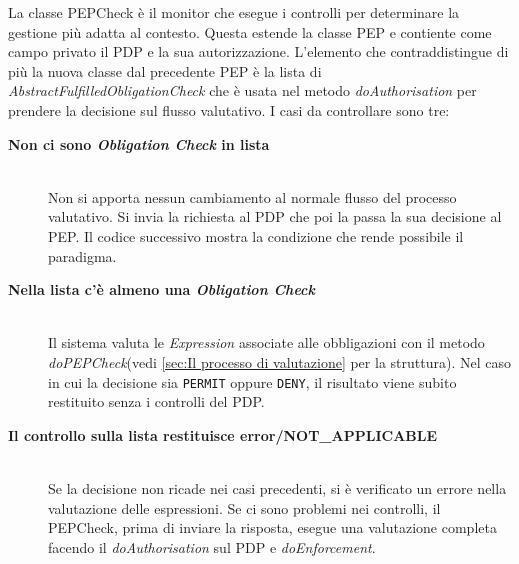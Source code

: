 La classe PEPCheck è il monitor che esegue i controlli per determinare la gestione più adatta al contesto.
Questa estende la classe \ac{PEP} e contiente come campo privato il \ac{PDP} e la sua autorizzazione.
L'elemento che contraddistingue di più la nuova classe dal precedente \ac{PEP} è la lista di
\emph{AbstractFulfilledObligationCheck} che è usata nel metodo \emph{doAuthorisation}
per prendere la decisione sul flusso valutativo. I casi da controllare sono tre:
\begin{description}

  \item[\normalfont\bfseries{\MakeUppercase{N}on ci sono \emph{Obligation Check} in lista}]
  {
  \hfill \\
  Non si apporta nessun cambiamento al normale flusso del processo valutativo.
  Si invia la richiesta al PDP che poi la passa la sua decisione al PEP.
  Il codice successivo mostra la condizione che rende possibile il paradigma.
  }

  \item[\normalfont\bfseries{\MakeUppercase{N}ella lista c'è almeno una \emph{Obligation Check}}]
  {
  \hfill \\
  Il sistema valuta le \emph{Expression} associate alle obbligazioni con il metodo
  \emph{doPEPCheck}(vedi \ref{sec:Il processo di valutazione}
  per la struttura). Nel caso in cui la decisione sia \texttt{PERMIT} oppure \texttt{DENY},
  il risultato viene subito restituito senza i controlli del PDP.
  }

  \item[\normalfont\bfseries{\MakeUppercase{I}l controllo sulla lista restituisce error/NOT\_APPLICABLE}]
  {
  \hfill \\
  Se la decisione non ricade nei casi precedenti,
  si è verificato un errore nella valutazione delle espressioni. Se ci sono problemi nei controlli, il PEPCheck, prima di
  inviare la risposta, esegue una valutazione completa facendo il \emph{doAuthorisation} sul \ac{PDP} e \emph{doEnforcement}.
  }

\end{description}

